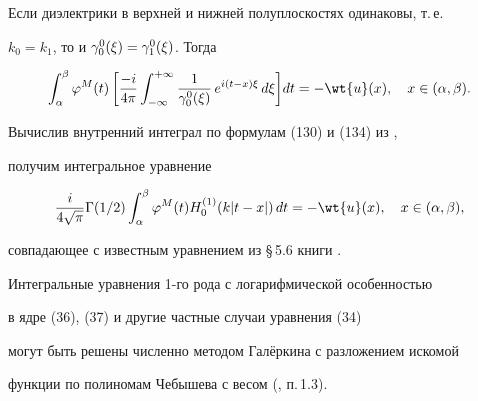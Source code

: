 Если диэлектрики в верхней и нижней полуплоскостях одинаковы, т.\,е.


$k_0=k_1$, то и $\gamma_{0}^0(\xi)=\gamma_{1}^0(\xi)$. Тогда


$$


\int_{\al}^{\be} \fy^M(t)\,\bigg[ \frac{-i}{4\pi}


\int_{-\infty}^{+\infty} \frac{1}{\gaoxi{0}}


\,e^{i(t-x)\xi}\,d\xi \bigg] dt = - \wt{u}(x), \quad x\in (\al, \be).


$$


Вычислив внутренний интеграл по формулам (130) и (134) из \cite{BP.IPOF},


получим интегральное уравнение


\begin{equation}


\frac{i}{4\sqrt{\pi}}\Ga(1/2) \int_{\al}^{\be} \fy^M(t)


H^{(1)}_0(k|t-x|)\,dt = - \wt{u}(x),\quad x\in (\al,\be),


\end{equation}


совпадающее с известным уравнением из \S\,5.6 книги \cite{Nobl.MVX}.





Интегральные уравнения 1-го рода с логарифмической особенностью


в ядре (36), (37) и другие частные случаи уравнения (34)


могут быть решены численно методом Гал\"еркина с разложением искомой


функции по полиномам Чебышева с весом (\cite{IlSm.DEVPTE}, п.\,1.3).








